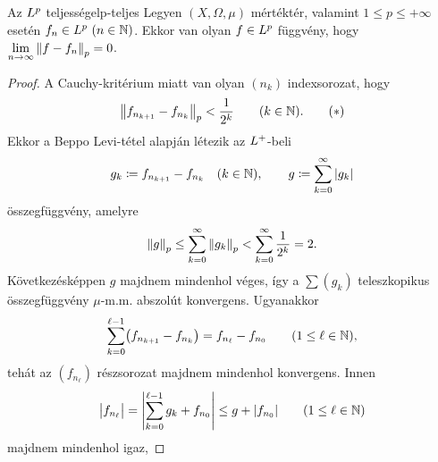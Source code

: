 \documentclass[
]{elteikthesis}[2024/04/26]
\begin{document}
	\begin{theorem}{Az \( \Lebesgue[p] \) teljessége}{lp-teljes}
		Legyen \( (X, \Omega, \mu) \) mértéktér, 
		valamint \( 1 \leq p \leq +\infty \) esetén \( f_n \in \Lebesgue[p] \ (n \in \N) \).
		Ekkor van olyan \( f \in \Lebesgue[p] \) függvény,
		hogy \( \lim\limits_{n \to \infty} \norm{f - f_n}_p = 0 \).
	\end{theorem}
	\begin{proof}
		A Cauchy-kritérium miatt van olyan \( (n_k) \) indexsorozat, hogy
		\begin{equation}\label{eq:lp-teljes-cauchy-becslés}
			\norm\big{ f_{n_{k + 1}} - f_{n_k} }_p < \frac{1}{2^k} 
			\qquad (k \in \mathbb{N}).
			\tag{\( * \)}
		\end{equation}
		Ekkor a Beppo Levi-tétel alapján létezik az \( L^+ \)-beli
		\[
			g_k \coloneq f_{n_{k + 1}} - f_{n_k} \quad (k \in \mathbb{N}), \qquad
			g \coloneq \sum_{k=0}^{\infty} \abs{ g_k }
		\]
		összegfüggvény, amelyre
		\[
			\norm{g}_p \leq
			\sum_{k=0}^{\infty} \norm{ g_k }_p <
			\sum_{k=0}^{\infty} \frac{1}{2^k} =
			2.
		\]
		Következésképpen \( g \) majdnem mindenhol véges, 
		így a \( \sum( g_k ) \) teleszkopikus összegfüggvény \( \mu \)-m.m. abszolút konvergens.
		Ugyanakkor
		\[
			\sum_{k=0}^{\ell - 1} \bigl( f_{n_{k + 1}} - f_{n_k} \bigr) =
			f_{n_\ell} - f_{n_0}
			\qquad (1 \leq \ell \in \mathbb{N}),
		\]
		tehát az \( (f_{n_\ell}) \) részsorozat majdnem mindenhol konvergens. Innen
		\[
			\abs\big{ f_{n_\ell} } =
			\abs\Bigg{ \sum_{k=0}^{\ell - 1} g_k + f_{n_0} } \leq g + \abs{ f_{n_0} }
			\qquad (1 \leq \ell \in \mathbb{N})
		\]
		majdnem mindenhol igaz,
\end{proof}
\end{document}
